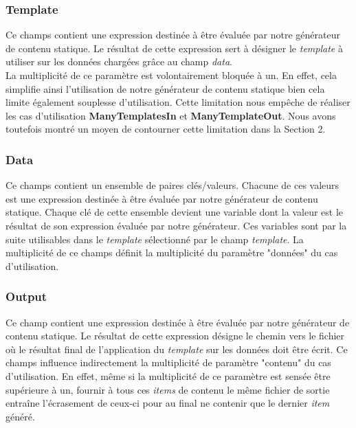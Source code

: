 		\subsubsection*{Template}
			Ce champs contient une expression destinée à être évaluée par notre générateur de contenu statique. Le résultat de cette expression sert à désigner le \textit{template} à utiliser sur les données chargées grâce au champ \textit{data}.\\
			
			La multiplicité de ce paramètre est volontairement bloquée à un. En effet, cela simplifie ainsi l'utilisation de notre générateur de contenu statique bien cela limite également souplesse d'utilisation. Cette limitation nous empêche de réaliser les cas d'utilisation \textbf{ManyTemplatesIn} et \textbf{ManyTemplateOut}. Nous avons toutefois montré un moyen de contourner cette limitation dans la Section 2.
		
		\subsubsection*{Data}
			Ce champs contient un ensemble de paires clés/valeurs. Chacune de ces valeurs est une expression destinée à être évaluée par notre générateur de contenu statique. Chaque clé de cette ensemble devient une variable dont la valeur est le résultat de son expression évaluée par notre générateur. Ces variables sont par la suite utilisables dans le \textit{template} sélectionné par le champ \textit{template}. La multiplicité de ce champs définit la multiplicité du paramètre "données" du cas d'utilisation. 
		
		\subsubsection*{Output}
			Ce champ contient une expression destinée à être évaluée par notre générateur de contenu statique. Le résultat de cette expression désigne le chemin vers le fichier où le résultat final de l'application du \textit{template} sur les données doit être écrit. Ce champs influence indirectement la multiplicité de paramètre "contenu" du cas d'utilisation. En effet, même si la multiplicité de ce paramètre est sensée être supérieure à un, fournir à tous ces \textit{items} de contenu le même fichier de sortie entraîne l'écrasement de ceux-ci pour au final ne contenir que le dernier \textit{item} généré.
	

